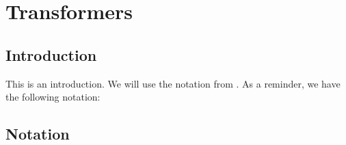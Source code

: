 \documentclass[../main.tex]{subfiles}
\begin{document}
\section{Transformers}
\subsection{Introduction}

This is an introduction.
We will use the notation from \cite{vaswani2017attention}. As a reminder, we have the following notation:

\subsection{Notation}

\end{document}
